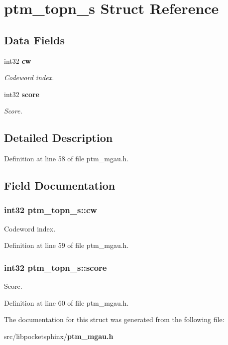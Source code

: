 \section{ptm\-\_\-topn\-\_\-s Struct Reference}
\label{structptm__topn__s}
\subsection*{Data Fields}
\begin{DoxyCompactItemize}
\item 
int32 {\bf cw}
\begin{DoxyCompactList}\small\item\em Codeword index. \end{DoxyCompactList}\item 
int32 {\bf score}
\begin{DoxyCompactList}\small\item\em Score. \end{DoxyCompactList}\end{DoxyCompactItemize}


\subsection{Detailed Description}


Definition at line 58 of file ptm\-\_\-mgau.\-h.



\subsection{Field Documentation}
\subsubsection[{cw}]{\setlength{\rightskip}{0pt plus 5cm}int32 ptm\-\_\-topn\-\_\-s\-::cw}\label{structptm__topn__s_a8a46095488efefa2714214a7a74117b1}


Codeword index. 



Definition at line 59 of file ptm\-\_\-mgau.\-h.

\subsubsection[{score}]{\setlength{\rightskip}{0pt plus 5cm}int32 ptm\-\_\-topn\-\_\-s\-::score}\label{structptm__topn__s_aa2080ad2d4f038cdbfbf46bf90884f56}


Score. 



Definition at line 60 of file ptm\-\_\-mgau.\-h.



The documentation for this struct was generated from the following file\-:\begin{DoxyCompactItemize}
\item 
src/libpocketsphinx/{\bf ptm\-\_\-mgau.\-h}\end{DoxyCompactItemize}
